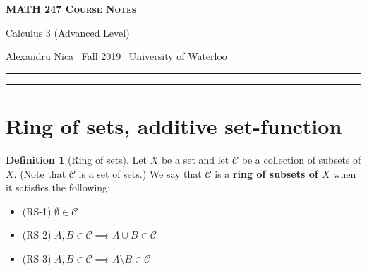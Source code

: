 \documentclass[11pt]{article}
\theoremstyle{definition}
\newtheorem{defn}[thm]{Definition}
\newcommand{\newtitle}[4]{
  \begin{center}
	\huge{\textbf{\textsc{#1 Course Notes}}}
    
	\large{\sc #2}
    
	{\sc #3 \textbullet\, #4 \textbullet\, University of Waterloo}
	\normalsize\vspace{1cm}\hrule\vspace{0.5cm}
  \end{center}
  \vspace{-0.4cm}
}
\begin{document}
\newtitle{MATH 247}{Calculus 3 (Advanced Level)}{Alexandru Nica}{Fall 2019}

\tableofcontents\thispagestyle{fancy}
\vspace{1cm}\hrule
\newpage
{}

\section{Ring of sets, additive set-function}

\begin{defn}[Ring of sets]
Let $\bar{X}$ be a set and let $\mathcal{C}$ be a collection of subsets of $\bar{X}$. (Note that $\mathcal{C}$ is a set of sets.) We say that $\mathcal{C}$ is a {\bf ring of subsets of $\bar{X}$} when it satisfies the following:
\vspace{-1.5ex}
\begin{itemize}
\item (RS-1) $\emptyset \in \mathcal{C}$
\item (RS-2) $A, B \in \mathcal{C} \implies A \cup B \in \mathcal{C}$
\item (RS-3) $A, B \in \mathcal{C} \implies A \setminus B \in \mathcal{C}$
\end{itemize}
\end{defn}
\end{document}
